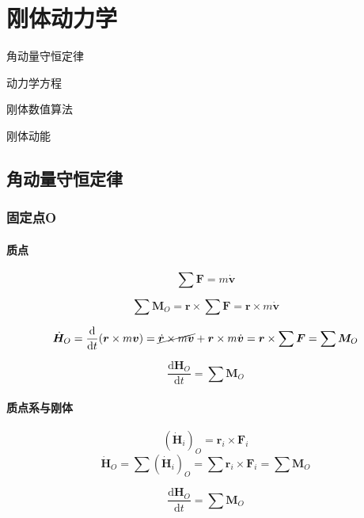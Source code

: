 \chapter{刚体动力学}
\begin{introduction}
\item 角动量守恒定律
\item 动力学方程
\item 刚体数值算法
\item 刚体动能
\end{introduction}

\section{角动量守恒定律}
\subsection{固定点O}
\subsubsection*{质点}
\begin{equation}
  \sum \bm{F}=m\dot{\bm{v}}
\end{equation}

\begin{equation}
  \sum \bm{M}_O=\bm{r}\times\sum \bm{F}=\bm{r}\times m\dot{\bm{v}}
\end{equation}

\begin{equation}
  \dot{\bm{H}}_O=\frac{\mathrm{d}}{\mathrm{d}t}(\bm{r}\times m\bm{v})=\cancel{\dot{\bm{r}}\times m\bm{v}}+\bm{r}\times m\dot{\bm{v}}=\bm{r}\times\sum \bm{F}=\sum \bm{M}_O
\end{equation}
\begin{theorem}[固定点O质点角动量守恒定律]
  \begin{equation}
    \frac{\mathrm{d}\bm{H}_O}{\mathrm{d}t}=\sum \bm{M}_O
  \end{equation}
\end{theorem}

\subsubsection*{质点系与刚体}
\begin{equation}
  (\dot{\bm{H}}_i)_O=\bm{r}_i\times\bm{F}_i
\end{equation}
\begin{equation}
  \dot{\bm{H}}_O=\sum(\dot{\bm{H}}_i)_O=\sum\bm{r}_i\times\bm{F}_i=\sum\bm{M}_O
\end{equation}
\begin{theorem}[固定点O质点系与刚体角动量守恒定律]
  \begin{equation}
    \frac{\mathrm{d}\bm{H}_O}{\mathrm{d}t}=\sum \bm{M}_O
  \end{equation}
\end{theorem}

